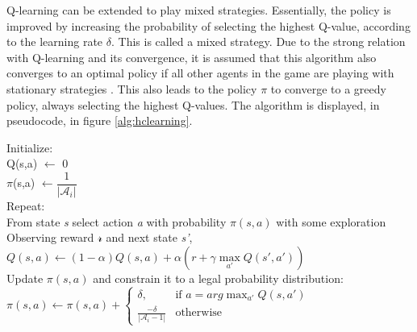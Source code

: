 Q-learning can be extended to play mixed strategies. Essentially, the policy is improved by increasing the probability of selecting the highest Q-value, according to the learning rate $\delta$. This is called a mixed strategy. Due to the strong relation with Q-learning and its convergence, it is assumed that this algorithm also converges to an optimal policy if all other agents in the game are playing with stationary strategies \cite{bowling2001rational}. This also leads to the policy $\pi$ to converge to a greedy policy, always selecting the highest Q-values. The algorithm is displayed, in pseudocode, in figure \ref{alg:hclearning}.

\begin{center} 
\begin{mdframed}
\begin{algorithm}[H]
Initialize: \\
Q(s,a) $\leftarrow$ 0 \\
$\pi$(s,a) $\leftarrow \dfrac{1}{|\mathcal{A}_i|}$ \\

Repeat: \\
\tab From state \textit{s} select action \textit{a} with probability $\pi(s,a)$ with some exploration \\
\tab Observing reward $\mathcal{r}$ and next state \textit{s'}, \\
\tab $Q(s,a) \leftarrow (1- \alpha)Q(s,a) + \alpha \left( r + \gamma \max\limits_{a'} Q(s',a')\right)$ \\
\tab Update $\pi(s,a)$ and constrain it to a legal probability distribution: \\
$\pi(s,a)\leftarrow \pi (s,a) + \begin{cases}
	\delta, & \text{if } a = \textit{arg} \max_{a'} Q(s,a')\\
	\frac{-\delta}{|\mathcal{A}_i -1|} & \text{otherwise }
\end{cases}$\\
\end{algorithm}
\end{mdframed}
\label{alg:hclearning}
\end{center}